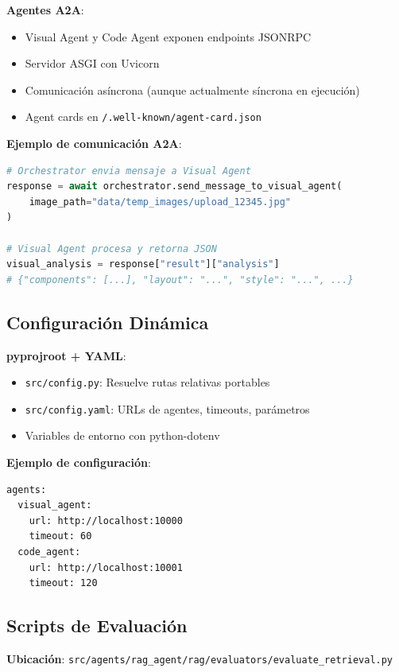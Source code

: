 \documentclass[12pt,a4paper]{article}
\begin{document}
\textbf{Agentes A2A}:
\begin{itemize}
    \item Visual Agent y Code Agent exponen endpoints JSONRPC
    \item Servidor ASGI con Uvicorn
    \item Comunicación asíncrona (aunque actualmente síncrona en ejecución)
    \item Agent cards en \texttt{/.well-known/agent-card.json}
\end{itemize}

\textbf{Ejemplo de comunicación A2A}:
\begin{lstlisting}[language=Python,caption={Llamada A2A desde Orchestrator}]
# Orchestrator envia mensaje a Visual Agent
response = await orchestrator.send_message_to_visual_agent(
    image_path="data/temp_images/upload_12345.jpg"
)

# Visual Agent procesa y retorna JSON
visual_analysis = response["result"]["analysis"]
# {"components": [...], "layout": "...", "style": "...", ...}
\end{lstlisting}

\subsection{Configuración Dinámica}

\textbf{pyprojroot + YAML}:
\begin{itemize}
    \item \texttt{src/config.py}: Resuelve rutas relativas portables
    \item \texttt{src/config.yaml}: URLs de agentes, timeouts, parámetros
    \item Variables de entorno con python-dotenv
\end{itemize}

\textbf{Ejemplo de configuración}:
\begin{lstlisting}[caption={config.yaml - Endpoints Agentes}]
agents:
  visual_agent:
    url: http://localhost:10000
    timeout: 60
  code_agent:
    url: http://localhost:10001
    timeout: 120
\end{lstlisting}

\subsection{Scripts de Evaluación}

\textbf{Ubicación}: \texttt{src/agents/rag\_agent/rag/evaluators/evaluate\_retrieval.py}
\end{document}
